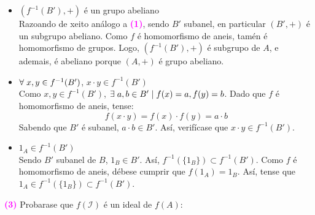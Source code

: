 \documentclass[twoside]{report}
\newcommand{\magbf}[1]{\textcolor{magenta}{\textbf{#1}}} %
\theoremstyle{mystyle}
\begin{document}
\begin{itemize}
    \item $(f^{-1}(B'), +)$ é un grupo abeliano\\
    
    Razoando de xeito análogo a \magbf{(1)}, sendo $B'$ subanel, en particular $(B', +)$ é un subgrupo abeliano. Como $f$ é homomorfismo de aneis, tamén é homomorfismo de grupos. Logo, $(f^{-1}(B'), +)$ é subgrupo de $A$, e ademais, é abeliano porque $(A, +)$ é grupo abeliano.\\
    
    \item $\forall \hspace{1mm} x, y \in f^{-1}(B')$, $x \cdot y \in f^{-1}(B')$\\
    
    Como $x,y \in f^{-1}(B')$, $\exists \hspace{1mm} a,b \in B' \hspace{1mm} | \hspace{1mm} f(x) = a, f(y) = b$. Dado que $f$ é homomorfismo de aneis, tense:
    $$f(x \cdot y) = f(x) \cdot f(y) = a \cdot b$$
    Sabendo que $B'$ é subanel, $a \cdot b \in B'$. Así, verifícase que $x \cdot y \in f^{-1}(B')$.\\
    
    \item $1_{A} \in f^{-1}(B')$\\
    
    Sendo $B'$ subanel de $B$, $1_{B} \in B'$. Así, $f^{-1}(\{1_{B}\}) \subset f^{-1}(B')$. Como $f$ é homomorfismo de aneis, débese cumprir que $f(1_{A}) = 1_{B}$. Así, tense que $1_{A} \in f^{-1}(\{1_{B}\}) \subset f^{-1}(B')$.\\
\end{itemize}

\magbf{(3)} Probarase que $f(\mathcal{I})$ é un ideal de $f(A)$:
\end{document}

